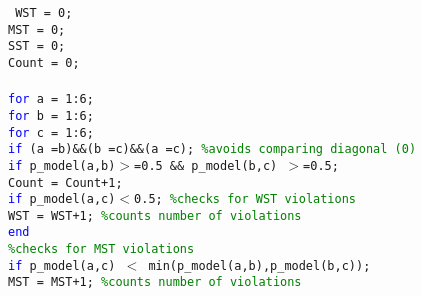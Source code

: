 \texttt{
\hspace{1mm}WST = 0; \\ 
\hspace{1mm}MST = 0; \\ 
\hspace{1mm}SST = 0; \\ 
\hspace{1mm}Count = 0; \\ 
\noindent
\hspace{1mm} \\ 
\hspace{1mm}\textcolor{blue}{for} a = 1:6; \\ 
\hspace{1mm}\indent \textcolor{blue}{for} b = 1:6; \\ 
\hspace{1mm}\indent \indent \textcolor{blue}{for} c = 1:6; \\ 
\hspace{1mm}\indent \indent \indent \textcolor{blue}{if} (a~=b)\&\&(b~=c)\&\&(a~=c); \textcolor{green}{\%avoids comparing diagonal (0) }\\ 
\hspace{1mm}\indent \indent \indent \indent \textcolor{blue}{if} p\_model(a,b)$>$=0.5 \&\& p\_model(b,c) $>$=0.5; \\ 
\hspace{1mm}\indent \indent \indent \indent \indent Count = Count+1; \\ 
\hspace{1mm}\indent \indent \indent \indent \indent \textcolor{blue}{if} p\_model(a,c)$<$0.5; \textcolor{green}{\%checks for WST violations }\\ 
\hspace{1mm}\indent \indent \indent \indent \indent \indent \indent WST = WST+1; \textcolor{green}{\%counts number of violations }\\ 
\hspace{1mm}\indent \indent \indent \indent \indent \indent \textcolor{blue}{end} \\ 
\hspace{1mm}\indent \indent \indent\indent \indent \indent \indent\indent \textcolor{green}{\%checks for MST violations }\\ 
\hspace{1mm}\indent \indent \indent \indent \indent \indent \indent \textcolor{blue}{if} p\_model(a,c) $<$ min(p\_model(a,b),p\_model(b,c)); \\ 
\hspace{1mm}\indent \indent \indent \indent \indent \indent \indent \indent MST = MST+1; \textcolor{green}{\%counts number of violations }\\ 
}
